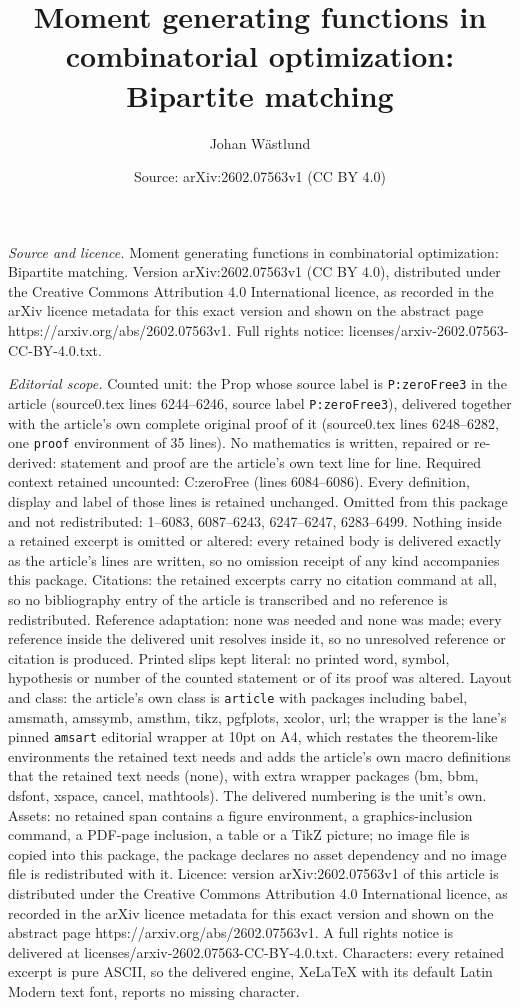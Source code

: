 \documentclass[10pt,a4paper]{amsart}
\title[Moment generating functions in combinatorial optimization: B]{Moment generating functions in combinatorial optimization: Bipartite matching}
\author{Johan W\"astlund}
\date{Source: arXiv:2602.07563v1 (CC BY 4.0)}
\begin{document}
\maketitle

\noindent\emph{Source and licence.} Moment generating functions in combinatorial optimization: Bipartite matching. Version arXiv:2602.07563v1 (CC BY 4.0), distributed under the Creative Commons Attribution 4.0 International licence, as recorded in the arXiv licence metadata for this exact version and shown on the abstract page https://arxiv.org/abs/2602.07563v1. Full rights notice: licenses/arxiv-2602.07563-CC-BY-4.0.txt.\par\smallskip

\noindent\textit{Editorial scope.} Counted unit: the Prop whose source label is \texttt{P:zeroFree3} in the article (source0.tex lines 6244--6246, source label \texttt{P:zeroFree3}), delivered together with the article's own complete original proof of it (source0.tex lines 6248--6282, one \texttt{proof} environment of 35 lines). No mathematics is written, repaired or re-derived: statement and proof are the article's own text line for line. Required context retained uncounted: C:zeroFree (lines 6084--6086). Every definition, display and label of those lines is retained unchanged. Omitted from this package and not redistributed: 1--6083, 6087--6243, 6247--6247, 6283--6499. Nothing inside a retained excerpt is omitted or altered: every retained body is delivered exactly as the article's lines are written, so no omission receipt of any kind accompanies this package. Citations: the retained excerpts carry no citation command at all, so no bibliography entry of the article is transcribed and no reference is redistributed. Reference adaptation: none was needed and none was made; every reference inside the delivered unit resolves inside it, so no unresolved reference or citation is produced. Printed slips kept literal: no printed word, symbol, hypothesis or number of the counted statement or of its proof was altered. Layout and class: the article's own class is \texttt{article} with packages including babel, amsmath, amssymb, amsthm, tikz, pgfplots, xcolor, url; the wrapper is the lane's pinned \texttt{amsart} editorial wrapper at 10pt on A4, which restates the theorem-like environments the retained text needs and adds the article's own macro definitions that the retained text needs (none), with extra wrapper packages (bm, bbm, dsfont, xspace, cancel, mathtools). The delivered numbering is the unit's own. Assets: no retained span contains a figure environment, a graphics-inclusion command, a PDF-page inclusion, a table or a TikZ picture; no image file is copied into this package, the package declares no asset dependency and no image file is redistributed with it. Licence: version arXiv:2602.07563v1 of this article is distributed under the Creative Commons Attribution 4.0 International licence, as recorded in the arXiv licence metadata for this exact version and shown on the abstract page https://arxiv.org/abs/2602.07563v1. A full rights notice is delivered at licenses/arxiv-2602.07563-CC-BY-4.0.txt. Characters: every retained excerpt is pure ASCII, so the delivered engine, XeLaTeX with its default Latin Modern text font, reports no missing character.
\end{document}
